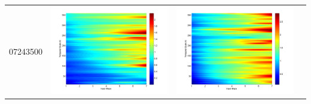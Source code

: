 \documentclass[11pt]{article}
\begin{document}
\begin{table}[H]
{\begin{tabular}{cccc}
07243500&\begin{minipage}{.3\textwidth}\includegraphics[width=\linewidth]{resultgraph/07243500p.png}\end{minipage}
&\begin{minipage}{.3\textwidth}\includegraphics[width=\linewidth]{resultgraph/07243500pep.png}\end{minipage}

\end{tabular}}
\end{table}
\end{document}
